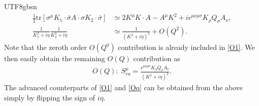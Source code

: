\documentclass[11pt]{article}\def\baselinestretch{1.4}
\def\e{{\epsilon}}
\def\h{\eta}
\def\m{{\mu}}
\def\n{{\nu}}
\def\r{{\rho}}
\def\s{{\sigma}}
\newcommand{\tr}{\text{tr}}
\begin{document}
\begin{CJK}{UTF8}{gbsn}
\begin{align}
\frac{1}{2}\tr[\s^\m K_1\cdot\bar{\s}A\cdot\s K_2\cdot\bar{\s}]&\simeq 2K^\m K\cdot A-A^\m K^2+i \e^{\m\n\r\s} K_\r Q_\s A_\n,\nonumber\\
\frac{1}{K_1^2+i\h}\frac{1}{K_2^2+i\h}&\simeq \frac{1}{(K^2+i\h)^2}+O(Q^2).
\end{align}
Note that the zeroth order $O(Q^0)$ contribution is already included in \eqref{O1}. We then easily obtain the remaining $O(Q)$ contribution as
\begin{align}\label{Oq}
O(Q):\;S_{ra}^\m=\frac{ \e^{\m\n\r\s} K_\r Q_\s A_\n}{(K^2+i\h)^2}.
\end{align}
The advanced counterparts of \eqref{O1} and \eqref{Oq} can be obtained from the above simply by flipping the sign of $i\h$.

\end{CJK}
\end{document}
